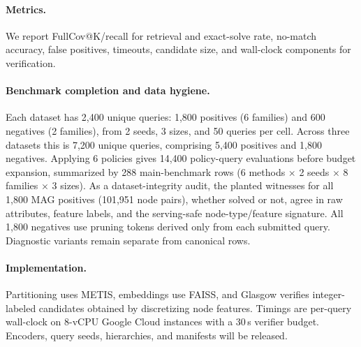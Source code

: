 \documentclass[runningheads]{llncs}
\begin{document}
\begin{table}[tb]
\centering
\caption{\textbf{Partition balance.} Coarse partitions are ranked by retrieval; fine partitions support local overlap and bridge construction. Node counts are per partition.}
\label{tab:partition_sizes}
\resizebox{\textwidth}{!}{}
\end{table}

\begin{table}[tb]
\centering
\caption{\textbf{Overlap expansion scale.} The operator adds boundary nodes of edge-sharing partitions, not whole neighboring partitions; the loose union bound is never materialized.}
\label{tab:partition_overlap}
\footnotesize
\resizebox{\textwidth}{!}{}
\end{table}

\paragraph{Metrics.}
We report FullCov@K/recall for retrieval and exact-solve rate, no-match accuracy, false positives, timeouts, candidate size, and wall-clock components for verification.

\paragraph{Benchmark completion and data hygiene.}
Each dataset has 2,400 unique queries: 1,800 positives (6 families) and 600 negatives (2 families), from 2 seeds, 3 sizes, and 50 queries per cell. Across three datasets this is 7,200 unique queries, comprising 5,400 positives and 1,800 negatives. Applying 6 policies gives 14,400 policy-query evaluations before budget expansion, summarized by 288 main-benchmark rows (6 methods $\times$ 2 seeds $\times$ 8 families $\times$ 3 sizes). As a dataset-integrity audit, the planted witnesses for all 1,800 MAG positives (101,951 node pairs), whether solved or not, agree in raw attributes, feature labels, and the serving-safe node-type/feature signature. All 1,800 negatives use pruning tokens derived only from each submitted query. Diagnostic variants remain separate from canonical rows.

\paragraph{Implementation.} Partitioning uses METIS, embeddings use FAISS, and Glasgow verifies integer-labeled candidates obtained by discretizing node features. Timings are per-query wall-clock on 8-vCPU Google Cloud instances with a 30\,s verifier budget. Encoders, query seeds, hierarchies, and manifests will be released.
\end{document}
